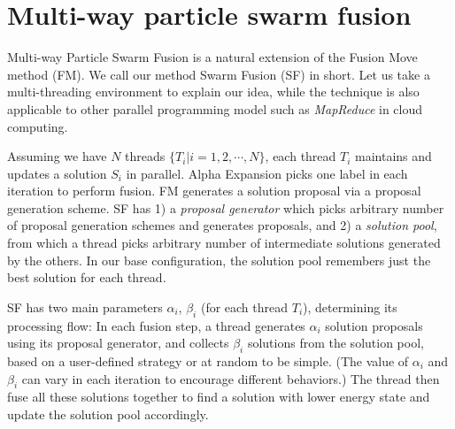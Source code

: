 \section{Multi-way particle swarm fusion}
Multi-way Particle Swarm Fusion is a natural extension of the Fusion
Move method (FM). We call our method Swarm Fusion (SF) in short. Let us
take a multi-threading environment to explain our idea, while the
technique is also applicable to other parallel programming model such as
{\it MapReduce} in cloud computing.
%

Assuming we have $N$ threads $\{T_i | i=1, 2, \cdots, N\}$, each thread
$T_i$ maintains and updates a solution $S_i$ in parallel. Alpha
Expansion picks one label in each iteration to perform fusion. FM
generates a solution proposal via a proposal generation scheme.
SF has 1) a {\it proposal generator} which picks
arbitrary number of proposal generation schemes and generates proposals,
and 2) a {\it solution pool}, from which a thread picks arbitrary number
of intermediate solutions generated by the others.
%
%
In our base configuration, the solution pool remembers just the best
solution for each thread.

SF has two main parameters $\alpha_i$, $\beta_i$ (for each thread
$T_i$), determining its processing flow: In each fusion step, a thread
generates $\alpha_i$ solution proposals using its proposal generator, and collects
$\beta_i$ solutions from the solution pool, based on a user-defined
strategy or at random to be simple. (The value of $\alpha_i$ and
$\beta_i$ can vary in each iteration to encourage different behaviors.)
The thread then fuse all these solutions together to find a solution
with lower energy state and update the solution pool accordingly.
%


